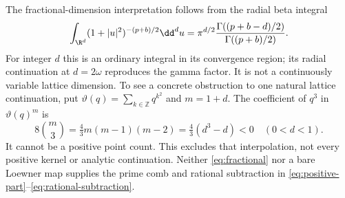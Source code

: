The fractional-dimension interpretation follows from the radial beta
integral
\begin{equation}\label{eq:fractional}
 \int_{\R^d}(1+|u|^2)^{-(p+b)/2}\dd^d u
 =\pi^{d/2}\frac{\Gamma((p+b-d)/2)}{\Gamma((p+b)/2)}.
\end{equation}
For integer $d$ this is an ordinary integral in its convergence region;
its radial continuation at $d=2\omega$ reproduces the gamma factor.
It is not a continuously variable lattice dimension. To see a concrete
obstruction to one natural lattice continuation, put
$\vartheta(q)=\sum_{k\in\mathbb Z}q^{k^2}$ and $m=1+d$.
The coefficient of $q^3$ in $\vartheta(q)^m$ is
\begin{equation}
 8\binom m3=\tfrac43m(m-1)(m-2)=\tfrac43(d^3-d)<0
 \quad(0<d<1).
\end{equation}
It cannot be a positive point count. This excludes that interpolation,
not every positive kernel or analytic continuation. Neither
\eqref{eq:fractional} nor a bare Loewner map supplies the prime comb and
rational subtraction in \eqref{eq:positive-part}--\eqref{eq:rational-subtraction}.
